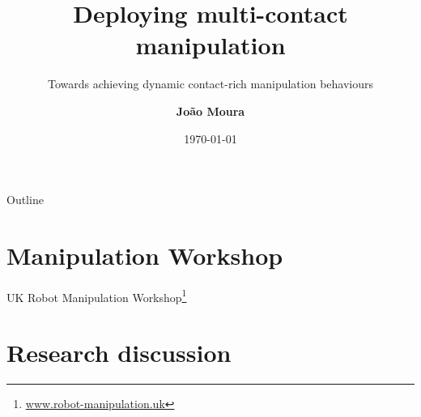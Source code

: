 \documentclass[aspectratio=169]{beamer}
\title{Deploying multi-contact manipulation}
\subtitle{Towards achieving dynamic contact-rich manipulation behaviours}
\author{\textbf{Jo\~{a}o Moura}}
\date{\today}
\begin{document}


\begin{frame}
  \maketitle
\end{frame}

\begin{frame}{Outline}
    \tableofcontents
\end{frame}

\section{Manipulation Workshop}

\begin{frame}{UK Robot Manipulation Workshop\footnote{\href{https://www.robot-manipulation.uk}{www.robot-manipulation.uk}}}
  \begin{center}
    \begin{figure}
    \end{figure}
  \end{center}
\end{frame}

\section{Research discussion}
\end{document}
